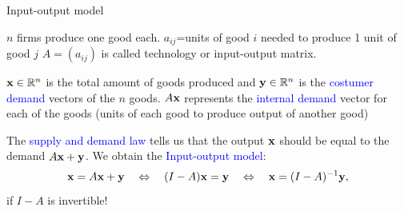 \documentclass[11pt,aspectratio=169]{beamer}
\begin{document}
\begin{frame}{Input-output model}

$n$ firms produce one good each.
\vskip 10pt
$a_{ij}$=units of good $i$ needed to produce 1 unit of good $j$
\vskip 10pt
$A=(a_{ij})$ is called technology or input-output matrix.

\vskip 10pt
${\bf x}\in \mathbb R^n$ is the total amount of goods produced and ${\bf y}\in \mathbb R^n$ is the \textcolor{blue}{costumer demand} vectors of the $n$ goods.
\vskip 10pt
$A{\bf x}$ represents the \textcolor{blue}{internal demand} vector for each of the goods (units of each good to produce output of another good)
\vskip 10pt

The \textcolor{blue}{supply and demand law} tells us that the output ${\bf x}$ should be equal to the demand $A\bf{x}+{\bf y}$. We obtain the \textcolor{blue}{Input-output model}: $${\bf x}=A{\bf x}+{\bf y} \quad \Leftrightarrow \quad (I-A){\bf x}={\bf y} \quad \Leftrightarrow \quad {\bf x}=(I-A)^{-1}{\bf y},$$
if $I-A$ is invertible!\end{frame}
\end{document}
